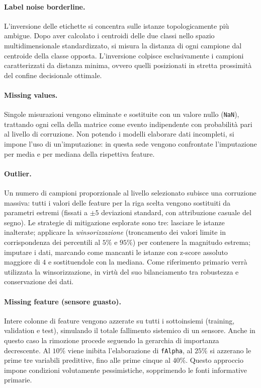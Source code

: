 \documentclass[12pt,a4paper]{article}
\begin{document}
\paragraph{Label noise borderline.} L'inversione delle etichette si concentra 
sulle istanze topologicamente più ambigue. Dopo aver calcolato i centroidi delle 
due classi nello spazio multidimensionale standardizzato, si misura la distanza 
di ogni campione dal centroide della classe opposta. L'inversione colpisce 
esclusivamente i campioni caratterizzati da distanza minima, ovvero quelli 
posizionati in stretta prossimità del confine decisionale ottimale.

\paragraph{Missing values.} Singole misurazioni vengono eliminate e sostituite 
con un valore nullo (\texttt{NaN}), trattando ogni cella della matrice come 
evento indipendente con probabilità pari al livello di corruzione. Non potendo 
i modelli elaborare dati incompleti, si impone l'uso di un'imputazione: in 
questa sede vengono confrontate l'imputazione per media e per mediana della 
rispettiva feature.

\paragraph{Outlier.} Un numero di campioni proporzionale al livello 
selezionato subisce una corruzione massiva: tutti i valori delle feature per la 
riga scelta vengono sostituiti da parametri estremi (fissati a $\pm 5$ 
deviazioni standard, con attribuzione casuale del segno). Le strategie di 
mitigazione esplorate sono tre: lasciare le istanze inalterate; applicare la 
\textit{winsorizzazione} (troncamento dei valori limite in corrispondenza dei 
percentili al $5\%$ e $95\%$) per contenere la magnitudo estrema; imputare i 
dati, marcando come mancanti le istanze con z-score assoluto maggiore di $4$ 
e sostituendole con la mediana. Come riferimento primario verrà utilizzata 
la winsorizzazione, in virtù del suo bilanciamento tra robustezza e 
conservazione dei dati.

\paragraph{Missing feature (sensore guasto).} Intere colonne di feature 
vengono azzerate su tutti i sottoinsiemi (training, validation e test), 
simulando il totale fallimento sistemico di un sensore. Anche in questo caso 
la rimozione procede seguendo la gerarchia di importanza decrescente. Al 
$10\%$ viene inibita l'elaborazione di \texttt{fAlpha}, al $25\%$ si 
azzerano le prime tre variabili predittive, fino alle prime cinque al $40\%$. 
Questo approccio impone condizioni volutamente pessimistiche, sopprimendo le 
fonti informative primarie.
\end{document}
